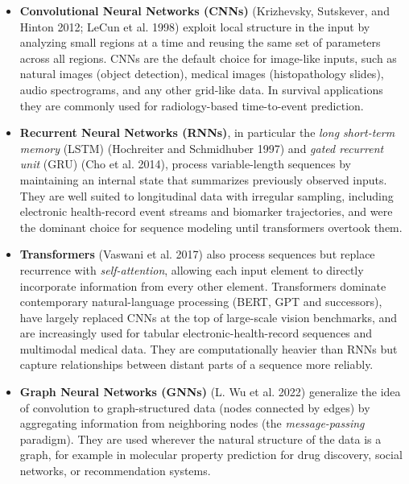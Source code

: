 \documentclass[
  letterpaper,
  krantz2]{style/krantz}
\providecommand{\tightlist}{%
  \setlength{\itemsep}{0pt}\setlength{\parskip}{0pt}}
\begin{document}
\begin{itemize}
\tightlist
\item
  \textbf{Convolutional Neural Networks (CNNs)} (Krizhevsky, Sutskever,
  and Hinton 2012; LeCun et al. 1998) exploit local structure in the
  input by analyzing small regions at a time and reusing the same set of
  parameters across all regions. CNNs are the default choice for
  image-like inputs, such as natural images (object detection), medical
  images (histopathology slides), audio spectrograms, and any other
  grid-like data. In survival applications they are commonly used for
  radiology-based time-to-event
  prediction.
\item
  \textbf{Recurrent Neural Networks (RNNs)}, in particular the
  \emph{long short-term memory} (LSTM) (Hochreiter and Schmidhuber 1997)
  and \emph{gated recurrent unit} (GRU) (Cho et al. 2014), process
  variable-length sequences by maintaining an internal state that
  summarizes previously observed inputs. They are well suited to
  longitudinal data with irregular sampling, including electronic
  health-record event streams and biomarker trajectories, and were the
  dominant choice for sequence modeling until transformers overtook
  them.
\item
  \textbf{Transformers} (Vaswani et al. 2017) also process sequences but
  replace recurrence with \emph{self-attention}, allowing each input
  element to directly incorporate information from every other element.
  Transformers dominate contemporary natural-language processing (BERT,
  GPT and successors), have largely replaced CNNs at the top of
  large-scale vision benchmarks, and are increasingly used for tabular
  electronic-health-record sequences and multimodal medical data. They
  are computationally heavier than RNNs but capture relationships
  between distant parts of a sequence more
  reliably.
\item
  \textbf{Graph Neural Networks (GNNs)} (L. Wu et al. 2022) generalize
  the idea of convolution to graph-structured data (nodes connected by
  edges) by aggregating information from neighboring nodes (the
  \emph{message-passing} paradigm). They are used wherever the natural
  structure of the data is a graph, for example in molecular property
  prediction for drug discovery, social networks, or recommendation
  systems.

\end{itemize}
\end{document}
